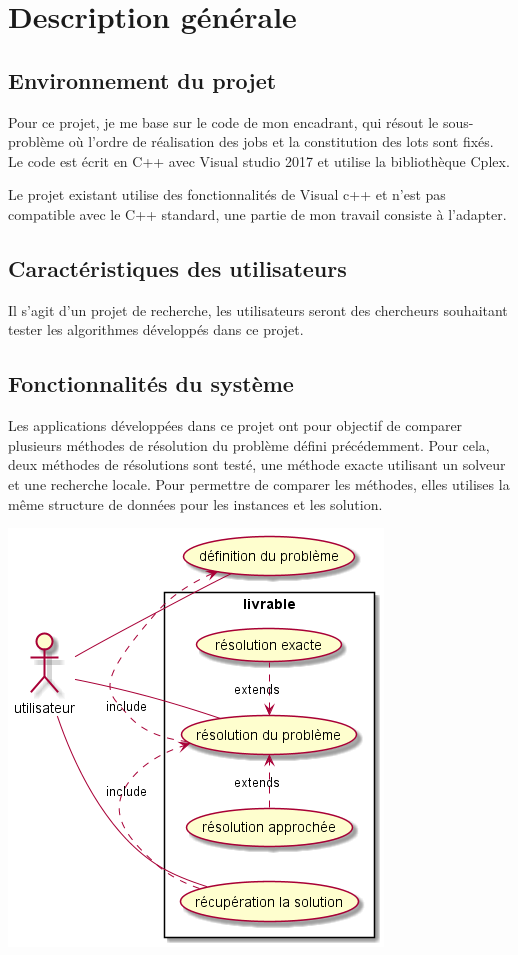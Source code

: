 \chapter{Description générale}

\section{Environnement du projet}
Pour ce projet, je me base sur le code de mon encadrant, qui résout le sous-problème où l'ordre de réalisation des jobs et la constitution des lots sont fixés.
Le code est écrit en C++ avec Visual studio 2017 et utilise la bibliothèque Cplex.

Le projet existant utilise des fonctionnalités de Visual c++ et n'est pas compatible avec le C++ standard,
 une partie de mon travail consiste à l'adapter.
\section{Caractéristiques des utilisateurs}
Il s'agit d'un projet de recherche, les utilisateurs seront des chercheurs souhaitant tester les algorithmes développés dans ce projet.
 
\section{Fonctionnalités du système}
Les applications développées dans ce projet ont pour objectif de comparer plusieurs méthodes de résolution du problème défini précédemment.
Pour cela, deux méthodes de résolutions sont testé,  une méthode exacte utilisant un solveur et une recherche locale.
Pour permettre de comparer les méthodes, elles utilises la même structure de données pour les instances et les solution.


\includegraphics[width=\textwidth]{parts/description_generale/use_cases}

